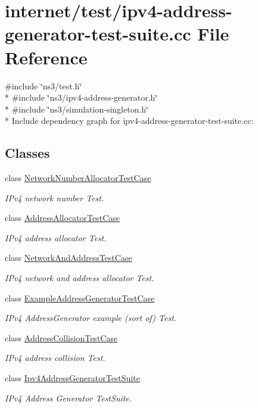 \hypertarget{ipv4-address-generator-test-suite_8cc}{}\section{internet/test/ipv4-\/address-\/generator-\/test-\/suite.cc File Reference}
\label{ipv4-address-generator-test-suite_8cc}
{\ttfamily \#include \char`\"{}ns3/test.\+h\char`\"{}}\\*
{\ttfamily \#include \char`\"{}ns3/ipv4-\/address-\/generator.\+h\char`\"{}}\\*
{\ttfamily \#include \char`\"{}ns3/simulation-\/singleton.\+h\char`\"{}}\\*
Include dependency graph for ipv4-\/address-\/generator-\/test-\/suite.cc\+:
\subsection*{Classes}
\begin{DoxyCompactItemize}
\item 
class \hyperlink{classNetworkNumberAllocatorTestCase}{Network\+Number\+Allocator\+Test\+Case}
\begin{DoxyCompactList}\small\item\em I\+Pv4 network number Test. \end{DoxyCompactList}\item 
class \hyperlink{classAddressAllocatorTestCase}{Address\+Allocator\+Test\+Case}
\begin{DoxyCompactList}\small\item\em I\+Pv4 address allocator Test. \end{DoxyCompactList}\item 
class \hyperlink{classNetworkAndAddressTestCase}{Network\+And\+Address\+Test\+Case}
\begin{DoxyCompactList}\small\item\em I\+Pv4 network and address allocator Test. \end{DoxyCompactList}\item 
class \hyperlink{classExampleAddressGeneratorTestCase}{Example\+Address\+Generator\+Test\+Case}
\begin{DoxyCompactList}\small\item\em I\+Pv4 Address\+Generator example (sort of) Test. \end{DoxyCompactList}\item 
class \hyperlink{classAddressCollisionTestCase}{Address\+Collision\+Test\+Case}
\begin{DoxyCompactList}\small\item\em I\+Pv4 address collision Test. \end{DoxyCompactList}\item 
class \hyperlink{classIpv4AddressGeneratorTestSuite}{Ipv4\+Address\+Generator\+Test\+Suite}
\begin{DoxyCompactList}\small\item\em I\+Pv4 Address Generator Test\+Suite. \end{DoxyCompactList}\end{DoxyCompactItemize}
